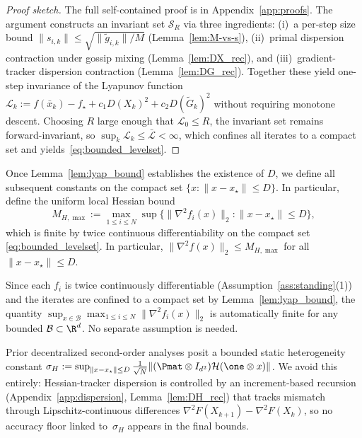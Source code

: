 \documentclass[review,onefignum,onetabnum]{siamart171218}
\begin{document}
	\begin{proof}[Proof sketch]
	The full self-contained proof is in Appendix~\ref{app:proofs}.
	The argument constructs an invariant set
	$\mathcal S_R$ via three ingredients:
	(i)~a per-step size bound $\|s_{i,k}\|\le\sqrt{\|\tilde g_{i,k}\|/M}$
	(Lemma~\ref{lem:M-vs-s}),
	(ii)~primal dispersion contraction under gossip mixing
	(Lemma~\ref{lem:DX_rec}), and
	(iii)~gradient-tracker dispersion contraction
	(Lemma~\ref{lem:DG_rec}).
	Together these yield one-step invariance of the Lyapunov function
	$\mathcal L_k:=f(\bar x_k)-f_\star+c_1 D(X_k)^2+c_2 D(\tilde G_k)^2$
	without requiring monotone descent.
	Choosing $R$ large enough that $\mathcal L_0\le R$, the
	invariant set remains forward-invariant, so
	$\sup_k\mathcal L_k\le\bar{\mathcal L}<\infty$,
	which confines all iterates to a compact set and
	yields~\eqref{eq:bounded_levelset}.
	\end{proof}

	Once Lemma~\ref{lem:lyap_bound} establishes the existence of $D$,
	we define all subsequent constants on the compact set $\{x:\|x-x_\star\|\le D\}$.
	In particular, define the uniform local Hessian bound
	\begin{equation}\label{eq:MHmax_def}
		M_{H,\max}\!:=\!\max_{1\le i\le N}\sup\{\|\nabla^2 f_i(x)\|_2:\|x\!-\!x_\star\|\!\le\! D\},
	\end{equation}
	which is finite by twice continuous differentiability on the compact set \eqref{eq:bounded_levelset}.
	In particular, $\|\nabla^2 f(x)\|_2\le M_{H,\max}$ for all $\|x-x_\star\|\le D$.

	\begin{remark}
		Since each $f_i$ is twice continuously differentiable (Assumption~\ref{ass:standing}(1))
		and the iterates are confined to a compact set by Lemma~\ref{lem:lyap_bound},
		the quantity $\sup_{x\in\mathcal B}\max_{1\le i\le N}\|\nabla^2 f_i(x)\|_2$
		is automatically finite for any bounded $\mathcal B\subset\R^d$.
		No separate assumption is needed.
	\end{remark}

	\begin{remark}
		Prior decentralized second-order analyses
		\citep{mokhtari2016esom,sun2022sonata,maritan2023networkgiant} posit a bounded
		static heterogeneity constant
		$\sigma_H:=\sup_{\|x-x_\star\|\le D}
		  \frac{1}{\sqrt N}\|(\Pmat\otimes I_{d^2})\mathcal H(\one\otimes x)\|$.
		We avoid this entirely: Hessian-tracker dispersion is controlled
		by an increment-based recursion
		(Appendix~\ref{app:dispersion}, Lemma~\ref{lem:DH_rec})
		that tracks mismatch through Lipschitz-continuous
		differences $\nabla^2 F(X_{k+1})-\nabla^2 F(X_k)$,
		so no accuracy floor linked to~$\sigma_H$ appears in the
		final bounds.
	\end{remark}
\end{document}
